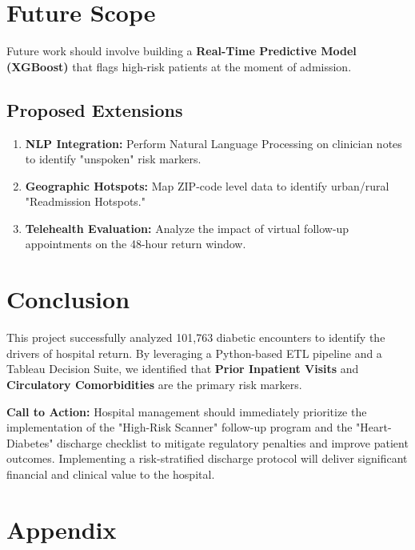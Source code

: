 \documentclass[12pt,a4paper]{article}
\begin{document}
\section{Future Scope}
Future work should involve building a \textbf{Real-Time Predictive Model (XGBoost)} that flags high-risk patients at the moment of admission. 

\subsection{Proposed Extensions}
\begin{enumerate}
    \item \textbf{NLP Integration:} Perform Natural Language Processing on clinician notes to identify "unspoken" risk markers.
    \item \textbf{Geographic Hotspots:} Map ZIP-code level data to identify urban/rural "Readmission Hotspots."
    \item \textbf{Telehealth Evaluation:} Analyze the impact of virtual follow-up appointments on the 48-hour return window.
\end{enumerate}

\section{Conclusion}
This project successfully analyzed 101,763 diabetic encounters to identify the drivers of hospital return. By leveraging a Python-based ETL pipeline and a Tableau Decision Suite, we identified that \textbf{Prior Inpatient Visits} and \textbf{Circulatory Comorbidities} are the primary risk markers. 

\textbf{Call to Action:} Hospital management should immediately prioritize the implementation of the "High-Risk Scanner" follow-up program and the "Heart-Diabetes" discharge checklist to mitigate regulatory penalties and improve patient outcomes. Implementing a risk-stratified discharge protocol will deliver significant financial and clinical value to the hospital.

\section{Appendix}
\end{document}
